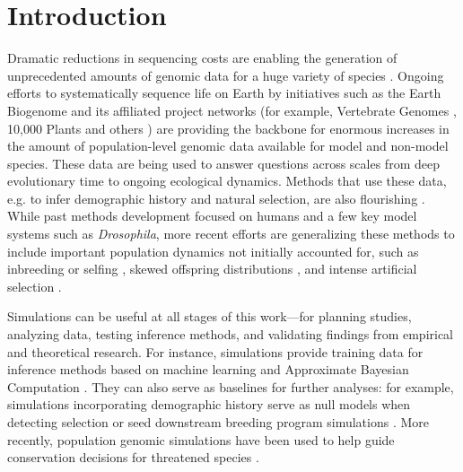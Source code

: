 \documentclass[hidelinks]{article}
\begin{document}
\section*{Introduction}
    \label{introduction}

Dramatic reductions in sequencing costs are enabling the generation of
unprecedented amounts of genomic data for a huge variety of species
\citep{Ellegren2014}. Ongoing efforts to systematically sequence life on
Earth by initiatives such as the Earth Biogenome \citep{Lewin2022} and its
affiliated project networks (for example, Vertebrate Genomes
\citep{Rhie2021}, 10,000 Plants \citep{Cheng2018} and others \citep{darwin2022sequence}) are
providing the backbone for enormous increases in the amount of population-level genomic data
available for model and non-model species.
These data are being used to answer questions across scales
from deep evolutionary time to ongoing ecological dynamics.
Methods that use these data, e.g. to infer demographic history and natural selection,
are also flourishing \citep{Beichman2018}.
While past methods development focused on humans and a few key model systems such as \emph{Drosophila},
more recent efforts are generalizing these methods to include 
important population dynamics not initially accounted for,
such as inbreeding or selfing \citep{Blischak2020}, skewed offspring
distributions \citep{Montano2016}, and intense artificial selection \citep{MacLeod2013, MacLeod2014}.

Simulations can be useful at all stages of this work---for
planning studies, analyzing data, testing inference methods,
and validating findings from empirical and theoretical research.
For instance, simulations provide training data
for inference methods based on machine learning \citep{Schrider2018} and
Approximate Bayesian Computation \citep{Csillery2010}. They can also serve as
baselines for further analyses: for example, simulations incorporating
demographic history serve as null models when detecting selection \citep{Hsieh2016a}
or seed downstream breeding program simulations \citep{Gaynor2020}.
More recently, population genomic simulations have been used to help guide conservation decisions for threatened species
\citep{Teixeira2021,kyriazis2022using}.
\end{document}
